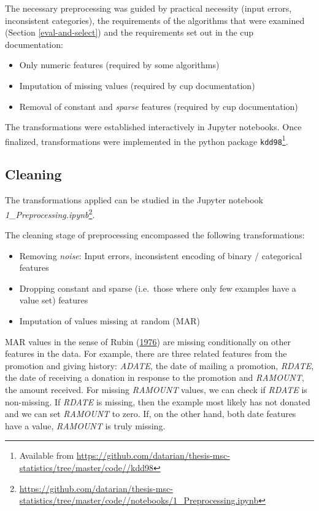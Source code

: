 \documentclass[
  11pt,
  a4paper,
  DIV=12,captions=tableheading,oneside,titlepage]{scrbook}
\providecommand{\tightlist}{%
  \setlength{\itemsep}{0pt}\setlength{\parskip}{0pt}}
\begin{document}
The necessary preprocessing was guided by practical necessity (input errors, inconsistent categories), the requirements of the algorithms that were examined (Section \ref{eval-and-select}) and the requirements set out in the cup documentation:

\begin{itemize}
\tightlist
\item
  Only numeric features (required by some algorithms)
\item
  Imputation of missing values (required by cup documentation)
\item
  Removal of constant and \emph{sparse} features (required by cup documentation)
\end{itemize}

The transformations were established interactively in Jupyter notebooks. Once finalized, transformations were implemented in the python package \texttt{kdd98}\footnote{Available from \url{https://github.com/datarian/thesis-msc-statistics/tree/master/code//kdd98}}.

\hypertarget{cleaning}{%
\subsection{Cleaning}\label{cleaning}}

The transformations applied can be studied in the Jupyter notebook \emph{1\_Preprocessing.ipynb}\footnote{\url{https://github.com/datarian/thesis-msc-statistics/tree/master/code//notebooks/1_Preprocessing.ipynb}}.

The cleaning stage of preprocessing encompassed the following transformations:

\begin{itemize}
\tightlist
\item
  Removing \emph{noise}: Input errors, inconsistent encoding of binary / categorical features
\item
  Dropping constant and sparse (i.e.~those where only few examples have a value set) features
\item
  Imputation of values missing at random (MAR)
\end{itemize}

MAR values in the sense of Rubin (\protect\hyperlink{ref-rubin1976inference}{1976}) are missing conditionally on other features in the data. For example, there are three related features from the promotion and giving history: \emph{ADATE}, the date of mailing a promotion, \emph{RDATE}, the date of receiving a donation in response to the promotion and \emph{RAMOUNT}, the amount received. For missing \emph{RAMOUNT} values, we can check if \emph{RDATE} is non-missing. If \emph{RDATE} is missing, then the example most likely has not donated and we can set \emph{RAMOUNT} to zero. If, on the other hand, both date features have a value, \emph{RAMOUNT} is truly missing.
\end{document}
